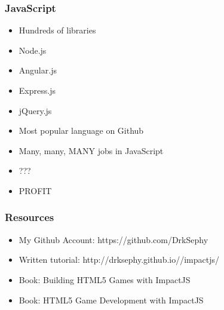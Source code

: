 \documentclass[red]{beamer}
\begin{document}
\begin{frame}
    \frametitle{JavaScript}
    \begin{itemize}
    \item<1-> Hundreds of libraries 
    \item<2-> Node.js
    \item<3-> Angular.js
    \item<4-> Express.js
    \item<5-> jQuery.js
    \item<6-> Most popular language on Github
    \item<7-> Many, many, MANY jobs in JavaScript
    \item<8-> ???
    \item<9-> PROFIT
    \end{itemize}
\end{frame}

\begin{frame}
    \frametitle{Resources}
    \begin{itemize}
    \item<1-> My Github Account: https://github.com/DrkSephy
    \item<2-> Written tutorial: http://drksephy.github.io//impactjs/
    \item<3-> Book: Building HTML5 Games with ImpactJS
    \item<4-> Book: HTML5 Game Development with ImpactJS
    \end{itemize}
\end{frame}
\end{document}
